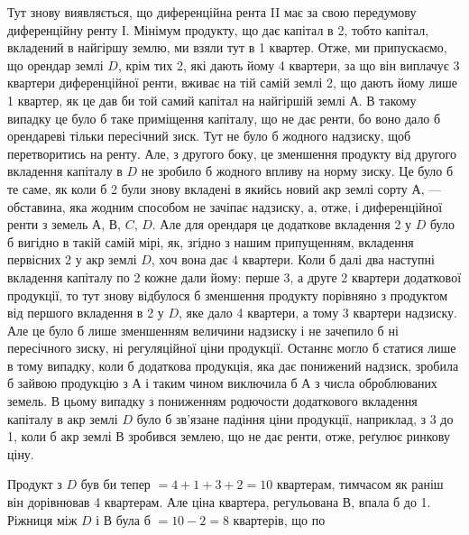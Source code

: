 Тут знову виявляється, що диференційна рента II має за свою передумову
диференційну ренту І. Мінімум продукту, що дає капітал в 2,
тобто капітал, вкладений в найгіршу землю, ми взяли тут в 1 квартер.
Отже, ми припускаємо, що орендар землі $D$, крім тих 2, які
дають йому 4 квартери, за що він виплачує 3 квартери диференційної ренти, вживає
на тій самій землі 2, що дають йому лише 1 квартер, як це дав
би той самий капітал на
найгіршій землі $А$. В такому випадку це було б таке приміщення капіталу,
що не дає ренти, бо воно дало б орендареві тільки пересічний зиск. Тут не
було б жодного надзиску, щоб перетворитись на ренту. Але, з другого боку, це
зменшення продукту від другого вкладення капіталу в $D$ не зробило б жодного
впливу на норму зиску. Це було б те саме, як коли б 2 були
знову вкладені в якийсь новий акр землі сорту $А$, — обставина, яка жодним способом
не зачіпає надзиску, а, отже, і диференційної ренти з земель $А$, $В$, $C$, $D$.
Але для орендаря це додаткове вкладення 2 у $D$ було б вигідно
в такій самій мірі, як, згідно з нашим припущенням, вкладення первісних
2 у акр землі $D$, хоч вона дає 4 квартери. Коли б далі два наступні
вкладення капіталу по 2 кожне дали йому: перше 3, а друге
2 квартери додаткової продукції, то тут знову відбулося б зменшення продукту
порівняно з продуктом від першого вкладення в 2 у $D$, яке
дало 4 квартери, а тому 3 квартери надзиску. Але це було б лише зменшенням
величини надзиску і не зачепило б ні пересічного зиску, ні регуляційної ціни
продукції. Останнє могло б статися лише в тому випадку, коли б додаткова
продукція, яка дає понижений надзиск, зробила б зайвою продукцію з $А$ і таким
чином виключила б $А$ з числа оброблюваних земель. В цьому випадку
з пониженням родючости додаткового вкладення капіталу в акр землі $D$ було б
зв’язане падіння ціни продукції, наприклад, з 3 до 1,
коли б акр землі $В$ зробився землею, що не дає ренти, отже, реґулює ринкову ціну.

Продукт з $D$ був би тепер $= 4 + 1 + 3 + 2 = 10$ квартерам, тимчасом
як раніш він дорівнював 4 квартерам. Але ціна квартера, регульована $В$, впала б
до 1. Ріжниця між $D$ і $В$ була б $= 10 - 2 = 8$ квартерів, що по
\parbreak{}  %
